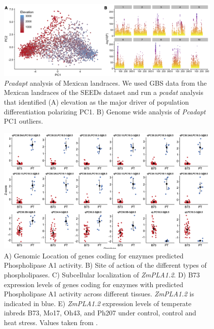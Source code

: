 \documentclass[9pt,twocolumn,twoside,lineno]{BioRxiv}
\begin{document}
\begin{figure}[t]
\begin{center}
\includegraphics[width=0.8\paperwidth]{Sup_Figures/Sup_Fig_2.png}
\caption{\textit{Pcadapt} analysis of Mexican landraces. We used GBS data from the Mexican landraces of the SEEDs dataset \cite{Romero_Navarro2017-cn} and run a \textit{pcadat} analysis \cite{Luu2017-ws} that identified (A) elevation as the major driver of population differentiation polarizing PC1.  
B) Genome wide analysis of \textit{Pcadapt} PC1 outliers. 
}
\label{SupFig2}
\end{center}
\end{figure} 

\clearpage

\begin{figure}[t]
\begin{center}
\includegraphics[width=0.8\paperwidth]{Sup_Figures/Sup_Fig_3.png}
\caption{A) Genomic Location of genes coding for enzymes predicted Phospholipase A1 activity. 
B) Site of action of the different types of phospholipases.
C) Subcellular localization of \textit{ZmPLA1.2}.
D) B73 expression levels of genes coding for enzymes with predicted Phospholipase A1 activity across different tissues. \textit{ZmPLA1.2} is indicated in blue. 
E) \textit{ZmPLA1.2} expression levels of temperate inbreds B73, Mo17, Oh43, and Ph207 under control, control and heat stress. Values taken from \cite{Waters2017-nat}. 
}
\label{SupFig4}
\end{center}
\end{figure}  
\end{document}
